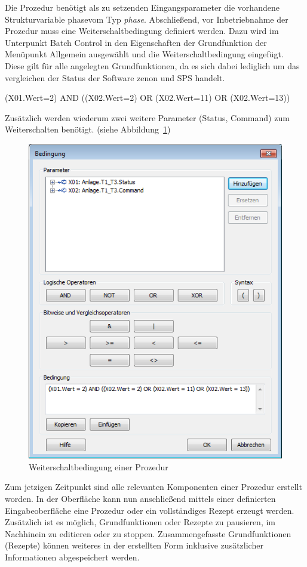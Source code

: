 	Die Prozedur benötigt als zu setzenden Eingangsparameter die vorhandene Strukturvariable \glqq phase\grqq \space vom Typ \textit{phase}. Abschließend, vor Inbetriebnahme der Prozedur muss eine Weiterschaltbedingung definiert werden. Dazu wird im Unterpunkt Batch Control in den Eigenschaften der Grundfunktion der Menüpunkt Allgemein ausgewählt und die Weiterschaltbedingung eingefügt. Diese gilt für alle angelegten Grundfunktionen, da es sich dabei lediglich um das vergleichen der Status der Software zenon und SPS handelt.
	
	\begin{framed}
		(X01.Wert=2) AND ((X02.Wert=2) OR (X02.Wert=11) OR (X02.Wert=13))
	\end{framed}
	
	Zusätzlich werden wiederum zwei weitere Parameter (Status, Command) zum Weiterschalten benötigt. (siehe Abbildung~\ref{fig:weiterschaltbedingung})\\
	
\begin{figure}[h!]
  \centering
  \includegraphics[height=0.8\textwidth]{graphics/implementation/weiterschaltbedingung}
  \caption{Weiterschaltbedingung einer Prozedur}
  \label{fig:weiterschaltbedingung}
\end{figure}

Zum jetzigen Zeitpunkt sind alle relevanten Komponenten einer Prozedur erstellt worden. In der Oberfläche kann nun anschließend mittels einer definierten Eingabeoberfläche eine Prozedur oder ein vollständiges Rezept erzeugt werden. Zusätzlich ist es möglich, Grundfunktionen oder Rezepte zu pausieren, im Nachhinein zu editieren oder zu stoppen. Zusammengefasste Grundfunktionen (Rezepte) können weiteres in der erstellten Form inklusive zusätzlicher Informationen abgespeichert werden.

